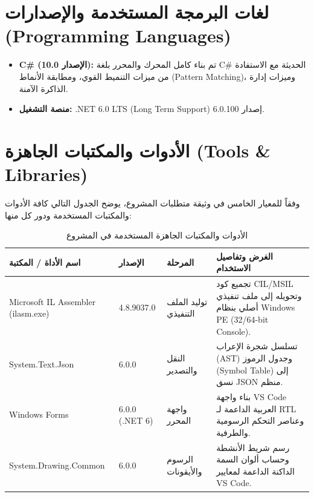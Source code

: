 \documentclass[12pt,a4paper]{report}
\begin{document}
\section{لغات البرمجة المستخدمة والإصدارات (Programming Languages)}
\begin{itemize}
    \item \textbf{C\# (الإصدار 10.0):} تم بناء كامل المحرك والمحرر بلغة C\# الحديثة مع الاستفادة من ميزات التنميط القوي، ومطابقة الأنماط (Pattern Matching)، وميزات إدارة الذاكرة الآمنة.
    \item \textbf{منصة التشغيل:} \textenglish{.NET 6.0 LTS (Long Term Support)} إصدار \textenglish{6.0.100}.
\end{itemize}

\section{الأدوات والمكتبات الجاهزة (Tools \& Libraries)}
وفقاً للمعيار الخامس في وثيقة متطلبات المشروع، يوضح الجدول التالي كافة الأدوات والمكتبات المستخدمة ودور كل منها:

\begin{table}[H]
    \centering
    \caption{الأدوات والمكتبات الجاهزة المستخدمة في المشروع}
    \begin{tabularx}{\textwidth}{l p{3.2cm} l X}
        \toprule
        \textbf{اسم الأداة / المكتبة} & \textbf{الإصدار} & \textbf{المرحلة} & \textbf{الغرض وتفاصيل الاستخدام} \\
        \midrule
        \textenglish{Microsoft IL Assembler (ilasm.exe)} & \textenglish{4.8.9037.0} & توليد الملف التنفيذي & تجميع كود CIL/MSIL وتحويله إلى ملف تنفيذي أصلي بنظام Windows PE (32/64-bit Console). \\
        \addlinespace
        \textenglish{System.Text.Json} & \textenglish{6.0.0} & النقل والتصدير & تسلسل شجرة الإعراب (AST) وجدول الرموز (Symbol Table) إلى نسق JSON منظم. \\
        \addlinespace
        \textenglish{Windows Forms} & \textenglish{6.0.0 (.NET 6)} & واجهة المحرر & بناء واجهة VS Code العربية الداعمة لـ RTL وعناصر التحكم الرسومية والطرفية. \\
        \addlinespace
        \textenglish{System.Drawing.Common} & \textenglish{6.0.0} & الرسوم والأيقونات & رسم شريط الأنشطة وحساب ألوان السمة الداكنة الداعمة لمعايير VS Code. \\
        \bottomrule
    \end{tabularx}
\end{table}
\end{document}
